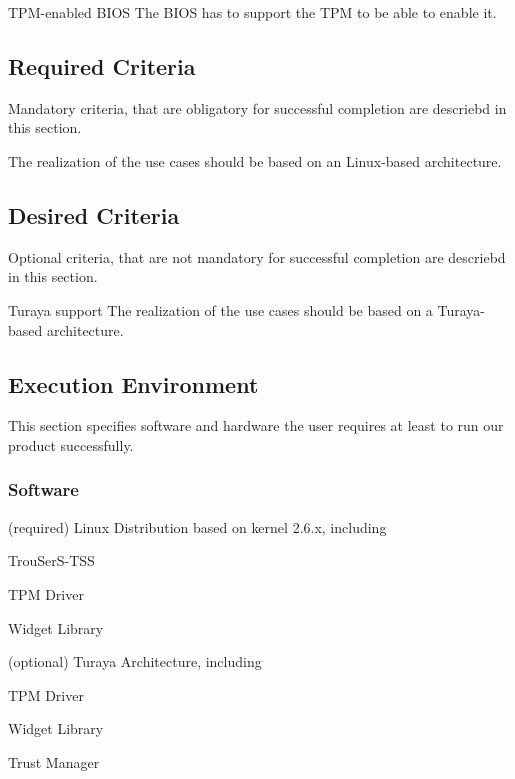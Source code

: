 \documentclass[
  american        %
]{sirrixreport}
\begin{document}
 {TPM-enabled BIOS}
The BIOS has to support the TPM to be able to enable it.

\subsection{Required Criteria}

Mandatory criteria, that are obligatory for successful completion are descriebd in this section.

The realization of the use cases should be based on an Linux-based architecture.


\subsection{Desired Criteria}

  Optional criteria, that are not mandatory for successful completion are descriebd in this section.

 {Turaya support} 
The realization of the use cases should be based on a Turaya-based architecture.

\subsection{Execution Environment}

   This section specifies software and hardware the user requires at
   least to run our product successfully.


\subsubsection{Software}
\label{subsec:software}
\begin{compactitem}
 \item (required) Linux Distribution based on kernel 2.6.x, including
   \begin{compactitem}
      \item TrouSerS-TSS
      \item TPM Driver
      \item Widget Library
   \end{compactitem}
 \item (optional) Turaya Architecture, including
   \begin{compactitem}
      \item TPM Driver
      \item Widget Library
      \item Trust Manager
   \end{compactitem}
\end{compactitem}
\end{document}
